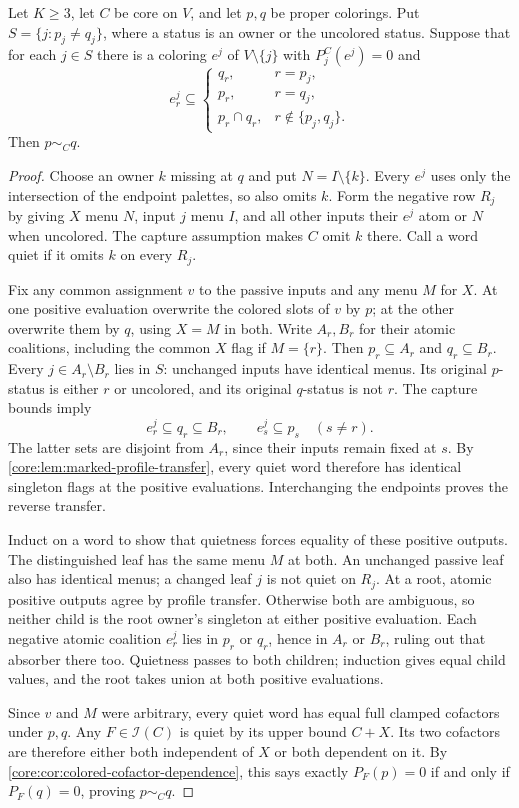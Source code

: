 \begin{theorem}
\label{core:thm:simultaneous-capture-probes}
Let $K\geq3$, let $C$ be core on $V$, and let $p,q$ be proper
colorings. Put $S=\{j:p_j\ne q_j\}$,
where a status is an owner or the uncolored status.
Suppose that for each $j\in S$ there is a coloring $e^j$ of
$V\setminus\{j\}$ with $P_j^C(e^j)=0$ and
\[
 e^j_r\subseteq
 \begin{cases}
 q_r,&r=p_j,\\
 p_r,&r=q_j,\\
 p_r\cap q_r,&r\notin\{p_j,q_j\}.
 \end{cases}
\]
Then $p\sim_Cq$.
\end{theorem}
\begin{proof}
Choose an owner $k$ missing at $q$ and put $N=I\setminus\{k\}$.
Every $e^j$ uses only the intersection of the endpoint palettes,
so also omits $k$. Form the negative row $R_j$ by giving $X$ menu
$N$, input $j$ menu $I$, and all other inputs their $e^j$ atom or
$N$ when uncolored. The capture assumption makes $C$ omit $k$ there.
Call a word quiet if it omits $k$ on every $R_j$.

Fix any common assignment $v$ to the passive inputs and any menu
$M$ for $X$. At one positive evaluation overwrite the colored slots
of $v$ by $p$; at the other overwrite them by $q$, using $X=M$
in both. Write $A_r,B_r$ for their atomic coalitions, including the
common $X$ flag if $M=\{r\}$. Then $p_r\subseteq A_r$ and
$q_r\subseteq B_r$.
Every $j\in A_r\setminus B_r$ lies in $S$: unchanged inputs have
identical menus. Its original $p$-status is either $r$ or uncolored,
and its original $q$-status is not $r$. The capture bounds imply
\[
 e^j_r\subseteq q_r\subseteq B_r,\qquad
 e^j_s\subseteq p_s\quad(s\ne r).
\]
The latter sets are disjoint from $A_r$, since their inputs remain
fixed at $s$. By \cref{core:lem:marked-profile-transfer}, every quiet
word therefore has identical singleton flags at the positive
evaluations. Interchanging the endpoints proves the reverse transfer.

Induct on a word to show that quietness forces equality of these
positive outputs. The distinguished leaf has the same menu $M$ at
both. An unchanged passive leaf also has identical menus; a changed
leaf $j$ is not quiet on $R_j$. At a root, atomic positive outputs
agree by profile transfer. Otherwise both are ambiguous, so neither
child is the root owner's singleton at either positive evaluation.
Each negative atomic coalition $e^j_r$ lies in $p_r$ or $q_r$,
hence in $A_r$ or $B_r$, ruling out that absorber there too.
Quietness passes to both children; induction gives equal child
values, and the root takes union at both positive evaluations.

Since $v$ and $M$ were arbitrary, every quiet word has equal full
clamped cofactors under $p,q$. Any $F\in\mathcal I(C)$ is quiet
by its upper bound $C+X$. Its two cofactors are therefore either
both independent of $X$ or both dependent on it. By
\cref{core:cor:colored-cofactor-dependence}, this says exactly
$P_F(p)=0$ if and only if $P_F(q)=0$, proving $p\sim_Cq$.
\end{proof}

